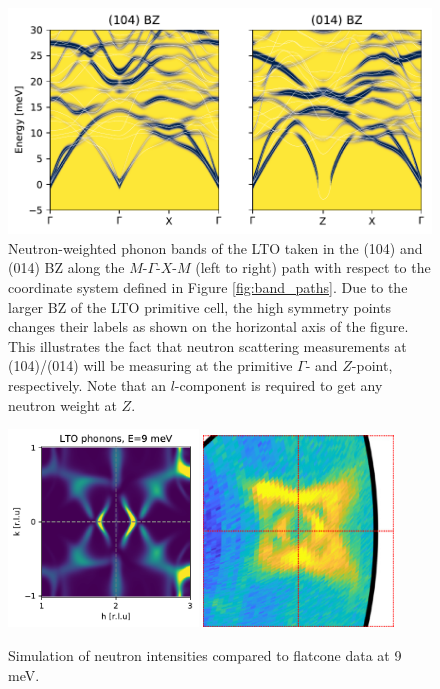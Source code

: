 \begin{figure}
	\centering
	\includegraphics[width=\textwidth]{fig/simulation/lco_soft_modes.pdf}
	\caption[LCO, LTO: soft mode simulation]{Neutron-weighted phonon bands of the LTO taken in the (104) and (014) BZ along the $M$-$\Gamma$-$X$-$M$ (left to right) path with respect to the coordinate system defined in Figure \ref{fig:band_paths}. Due to the larger BZ of the LTO primitive cell, the high symmetry points changes their labels as shown on the horizontal axis of the figure. This illustrates the fact that neutron scattering measurements at (104)/(014) will be measuring at the primitive $\Gamma$- and $Z$-point, respectively. Note that an $l$-component is required to get any neutron weight at $Z$.}
	\label{fig:lco_soft_sim}
\end{figure}

\begin{figure}
	\centering
	\includegraphics[width=0.45\textwidth]{fig/simulation/qxqy_neutron.pdf}
	\hspace{2em}
	\includegraphics[width=0.45\textwidth]{fig/simulation/flatcone_data.png}
	\caption[flatcone 9 meV compared to simulation]{Simulation of neutron intensities compared to flatcone data at 9 meV.}
	\label{fig:qxqy_neutron}
	
\end{figure}

